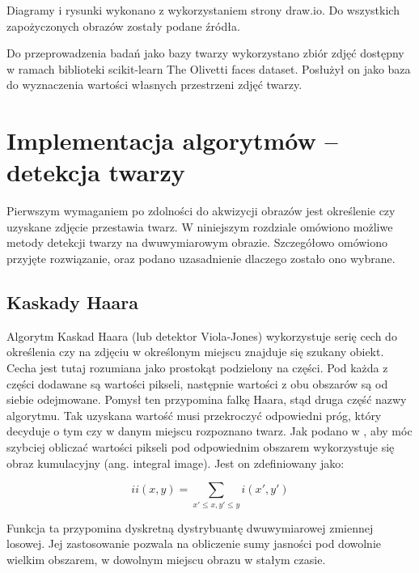 \documentclass[oneside, eng]{mgr}
\begin{document}
Diagramy i rysunki wykonano z wykorzystaniem strony draw.io. Do wszystkich zapożyczonych obrazów zostały podane źródła.

Do przeprowadzenia badań jako bazy twarzy wykorzystano zbiór zdjęć dostępny w ramach biblioteki scikit-learn The Olivetti faces dataset. Posłużył on jako baza do wyznaczenia wartości własnych przestrzeni zdjęć twarzy.

\newpage

\chapter{Implementacja algorytmów – detekcja twarzy}

Pierwszym wymaganiem po zdolności do akwizycji obrazów jest określenie czy uzyskane zdjęcie przestawia twarz. W niniejszym rozdziale omówiono możliwe metody detekcji twarzy na dwuwymiarowym obrazie. Szczegółowo omówiono przyjęte rozwiązanie, oraz podano uzasadnienie dlaczego zostało ono wybrane.

\section{Kaskady Haara}
Algorytm Kaskad Haara (lub detektor Viola-Jones) wykorzystuje serię cech do określenia czy na zdjęciu w określonym miejscu znajduje się szukany obiekt. Cecha jest tutaj rozumiana jako prostokąt podzielony na części. Pod każda z części dodawane są wartości pikseli, następnie wartości z obu obszarów są od siebie odejmowane. Pomysł ten przypomina falkę Haara, stąd druga część nazwy algorytmu. Tak uzyskana wartość musi przekroczyć odpowiedni próg, który decyduje o tym czy w danym miejscu rozpoznano twarz. Jak podano w \cite{Kaskada Haara}, aby móc szybciej obliczać wartości pikseli pod odpowiednim obszarem wykorzystuje się obraz kumulacyjny (ang. integral image). Jest on zdefiniowany jako:

\begin{equation}
	ii(x,y) = \sum_{x' \leq x, y' \leq y} i(x',y')
\end{equation}

Funkcja ta przypomina dyskretną dystrybuantę dwuwymiarowej zmiennej losowej. Jej zastosowanie pozwala na obliczenie sumy jasności pod dowolnie wielkim obszarem, w dowolnym miejscu obrazu w stałym czasie.
\end{document}
